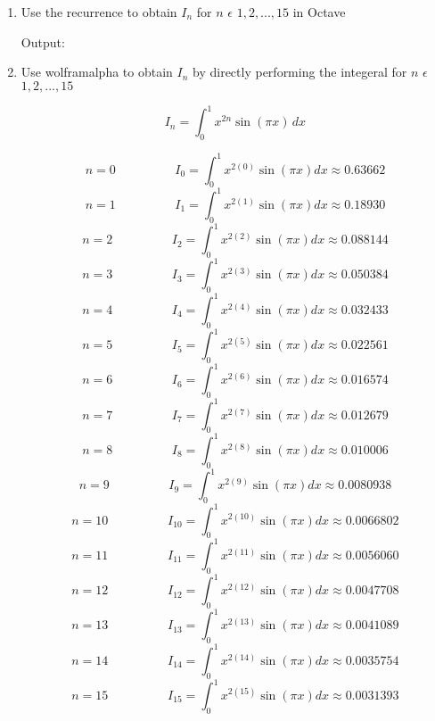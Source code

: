 \documentclass{article}
\begin{document}
\begin{enumerate}
\begin{enumerate}
\vspace{2cm}

\item Use the recurrence to obtain $I_{n}$ for $n$ $\epsilon$ ${1,2,...,15}$ in Octave

Output:


\vspace{2cm}


\item Use wolframalpha to obtain $I_{n}$ by directly performing the integeral for $n$ 
$\epsilon$ ${1,2,...,15}$

$$I_{n} = \int_{0}^{1} x^{2n} \sin(\pi x) \, dx$$

        $$n = 0 \hspace{2cm} I_{0} = \int_{0}^{1} x^{2(0)} \sin(\pi x) dx \approx 0.63662$$
        $$n = 1 \hspace{2cm} I_{1} = \int_{0}^{1} x^{2(1)} \sin(\pi x) dx \approx 0.18930$$
        $$n = 2 \hspace{2cm} I_{2} = \int_{0}^{1} x^{2(2)} \sin(\pi x) dx \approx 0.088144$$
        $$n = 3 \hspace{2cm} I_{3} = \int_{0}^{1} x^{2(3)} \sin(\pi x) dx \approx 0.050384$$
        $$n = 4 \hspace{2cm} I_{4} = \int_{0}^{1} x^{2(4)} \sin(\pi x) dx \approx 0.032433$$
        $$n = 5 \hspace{2cm} I_{5} = \int_{0}^{1} x^{2(5)} \sin(\pi x) dx \approx 0.022561$$
        $$n = 6 \hspace{2cm} I_{6} = \int_{0}^{1} x^{2(6)} \sin(\pi x) dx \approx 0.016574$$
        $$n = 7 \hspace{2cm} I_{7} = \int_{0}^{1} x^{2(7)} \sin(\pi x) dx \approx 0.012679$$
        $$n = 8 \hspace{2cm} I_{8} = \int_{0}^{1} x^{2(8)} \sin(\pi x) dx \approx 0.010006$$
        $$n = 9 \hspace{2cm} I_{9} = \int_{0}^{1} x^{2(9)} \sin(\pi x) dx \approx 0.0080938$$
        $$n = 10 \hspace{2cm} I_{10} = \int_{0}^{1} x^{2(10)} \sin(\pi x) dx \approx 0.0066802$$
        $$n = 11 \hspace{2cm} I_{11} = \int_{0}^{1} x^{2(11)} \sin(\pi x) dx \approx 0.0056060$$
        $$n = 12 \hspace{2cm} I_{12} = \int_{0}^{1} x^{2(12)} \sin(\pi x) dx \approx 0.0047708$$
        $$n = 13 \hspace{2cm} I_{13} = \int_{0}^{1} x^{2(13)} \sin(\pi x) dx \approx 0.0041089$$
        $$n = 14 \hspace{2cm} I_{14} = \int_{0}^{1} x^{2(14)} \sin(\pi x) dx \approx 0.0035754$$
        $$n = 15 \hspace{2cm} I_{15} = \int_{0}^{1} x^{2(15)} \sin(\pi x) dx \approx 0.0031393$$


\end{enumerate}
\end{enumerate}
\end{document}
